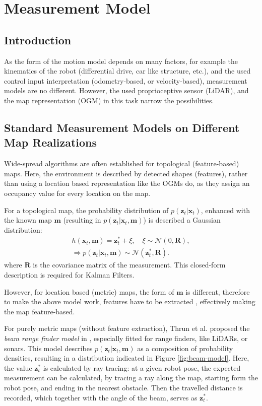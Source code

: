 \section{Measurement Model}

\subsection{Introduction}
As the form of the motion model depends on many factors, for example the kinematics of the robot
(differential drive, car like structure, etc.), and the used control input interpretation
(odometry-based, or velocity-based), measurement models are no different.
However, the used proprioceptive sensor (LiDAR), and the map representation (OGM) in this task
narrow the possibilities.

\subsection{Standard Measurement Models on Different Map Realizations}
Wide-spread algorithms are often established for topological (feature-based) maps.
Here, the environment is described by detected shapes (features), rather than using a location based representation
like the OGMs do, as they assign an occupancy value for every location on the map.

For a topological map, the probability distribution of $p(\mathbf{\mathbf{z}}_t | \mathbf{x}_t)$,
enhanced with the known map $\mathbf{m}$ (resulting in $p(\mathbf{\mathbf{z}}_t | \mathbf{x}_t,\mathbf{m})$)
is described a Gaussian distribution:
\begin{align}
    h(\mathbf{x}_t,\mathbf{m}) = \mathbf{z}^*_t + \xi, \quad \xi \sim \mathcal{N}(0,\mathbf{R}), \\
    \Rightarrow p(\mathbf{\mathbf{z}}_t | \mathbf{x}_t,\mathbf{m}) \sim \mathcal{N}(\mathbf{z}_t^*,\mathbf{R}).
\end{align}
where $\mathbf{R}$ is the covariance matrix of the measurement.
This closed-form description is required for Kalman Filters.

However, for location based (metric) maps, the form of $\mathbf{m}$ is different, therefore
to make the above model work, features have to be extracted \cite{Durrant-Whyte1991},
effectively making the map feature-based.

For purely metric maps (without feature extraction), Thrun et al. proposed the \emph{beam range finder model}
in \cite{Thrun2005}, especially fitted for range finders, like LiDARs, or sonars.
This model describes  $p(\mathbf{\mathbf{z}}_t | \mathbf{x}_t,\mathbf{m})$ as a composition of
probability densities, resulting in a distribution indicated in Figure \ref{fig:beam-model}.
Here, the value $\mathbf{z}_t^*$ is calculated by ray tracing: at a given robot pose,
the expected measurement can be calculated, by tracing a ray along the map, starting form
the robot pose, and ending in the nearest obstacle. Then the travelled distance is recorded,
which together with the angle of the beam, serves as $\mathbf{z}_t^*$.

